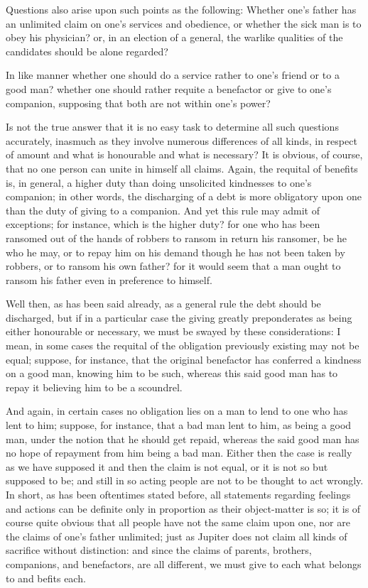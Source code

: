 
Questions also arise upon such points as the following: Whether one’s
father has an unlimited claim on one’s services and obedience, or whether
the sick man is to obey his physician? or, in an election of a general, the
warlike qualities of the candidates should be alone regarded?

In like manner whether one should do a service rather to one’s friend or
to a good man? whether one should rather requite a benefactor or give to
one’s companion, supposing that both are not within one’s power?

Is not the true answer that it is no easy task to determine all such questions
accurately, inasmuch as they involve numerous differences of all kinds, in
respect of amount and what is honourable and what is necessary? It is obvious,
of course, that no one person can unite in himself all claims. Again, the
requital of benefits is, in general, a higher duty than doing unsolicited
kindnesses to one’s companion; in other words, the discharging of a debt
is more obligatory upon one than the duty of giving to a companion. And yet
this rule may admit of exceptions; for instance, which is the higher duty? for
one who has been ransomed out of the hands of robbers to ransom in return his
ransomer, be he who he may, or to repay him on his demand though he has not
been taken by robbers, or to ransom his own father? for it would seem that a
man ought to ransom his father even in preference to himself.

Well then, as has been said already, as a general rule the debt should be
discharged, but if in a particular case the giving greatly preponderates as
being either honourable or necessary, we must be swayed by these
considerations: I mean, in some cases the requital of the obligation previously
existing may not be equal; suppose, for instance, that the original benefactor
has conferred a kindness on a good man, knowing him to be such, whereas this
said good man has to repay it believing him to be a scoundrel.

And again, in certain cases no obligation lies on a man to lend to one who has
lent to him; suppose, for instance, that a bad man lent to him, as being a good
man, under the notion that he should get repaid, whereas the said good man has
no hope of repayment from him being a bad man. Either then the case is really
as we have supposed it and then the claim is not equal, or it is not so but
supposed to be; and still in so acting people are not to be thought to act
wrongly. In short, as has been oftentimes stated before, all statements
regarding feelings and actions can be definite only in proportion as their
object-matter is so; it is of course quite obvious that all people have not the
same claim upon one, nor are the claims of one’s father unlimited; just
as Jupiter does not claim all kinds of sacrifice without distinction: and since
the claims of parents, brothers, companions, and benefactors, are all
different, we must give to each what belongs to and befits each.

